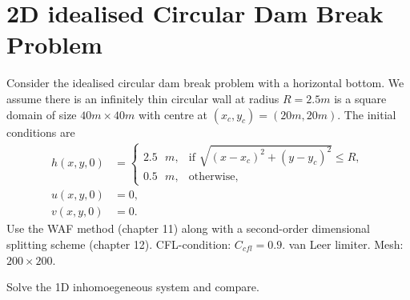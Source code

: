 \section{2D idealised Circular Dam Break Problem}
Consider the idealised circular dam break problem with a horizontal bottom.
We assume there is an infinitely thin circular wall at radius $R = 2.5 m$ is a square domain of size $40 m \times 40 m$ with centre at $(x_c,y_c) = (20 m, 20 m)$.
The initial conditions are
\begin{align*}
    h(x,y,0) &= \begin{cases}
        2.5 \text{ }m, & \text{if } \sqrt{ {(x-x_c)}^2 + {(y-y_c)}^2 } \leq R, \\
        0.5 \text{ }m, & \text{otherwise},
    \end{cases} \\
    u(x,y,0) &= 0, \\
    v(x,y,0) &= 0.
\end{align*}
Use the WAF method (chapter 11) along with a second-order dimensional splitting scheme (chapter 12).
CFL-condition: $C_{cfl} = 0.9$.
van Leer limiter. Mesh: $200 \times 200$.

Solve the 1D inhomoegeneous system and compare.



